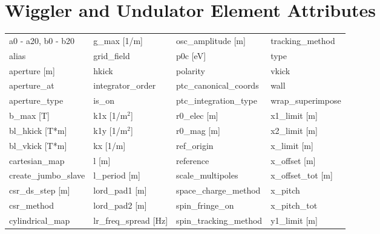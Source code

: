  \section{Wiggler and Undulator Element Attributes}
 \label{s:list.wiggler}
 
 \begin{tabular}{llll} \toprule
a0 - a20, b0 - b20               & g_max [1/m]                      & osc_amplitude [m]                & tracking_method                  \\
alias                            & grid_field                       & p0c [eV]                         & type                             \\
aperture [m]                     & hkick                            & polarity                         & vkick                            \\
aperture_at                      & integrator_order                 & ptc_canonical_coords             & wall                             \\
aperture_type                    & is_on                            & ptc_integration_type             & wrap_superimpose                 \\
b_max [T]                        & k1x [1/m$^2$]                    & r0_elec [m]                      & x1_limit [m]                     \\
bl_hkick [T*m]                   & k1y [1/m$^2$]                    & r0_mag [m]                       & x2_limit [m]                     \\
bl_vkick [T*m]                   & kx [1/m]                         & ref_origin                       & x_limit [m]                      \\
cartesian_map                    & l [m]                            & reference                        & x_offset [m]                     \\
create_jumbo_slave               & l_period [m]                     & scale_multipoles                 & x_offset_tot [m]                 \\
csr_ds_step [m]                  & lord_pad1 [m]                    & space_charge_method              & x_pitch                          \\
csr_method                       & lord_pad2 [m]                    & spin_fringe_on                   & x_pitch_tot                      \\
cylindrical_map                  & lr_freq_spread [Hz]              & spin_tracking_method             & y1_limit [m]                     \\

\end{tabular}
